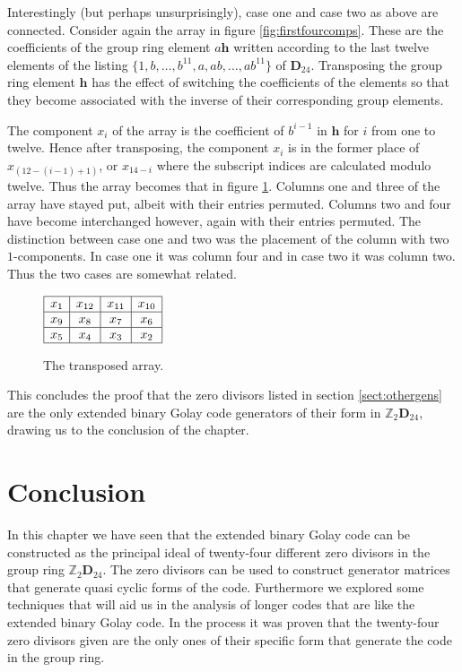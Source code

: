 Interestingly (but perhaps unsurprisingly), case one and case two as above are connected.
Consider again the array in figure \ref{fig:firstfourcomps}.
These are the coefficients of the group ring element $a \mathbf{h}$ written according to the last twelve elements of the listing $\{1,b,\ldots,b^{11},a,ab,\ldots,ab^{11}\}$ of $\mathbf{D}_{24}$.
Transposing the group ring element $\mathbf{h}$ has the effect of switching the coefficients of the elements so that they become associated with the inverse of their corresponding group elements.

The component $x_i$ of the array is the coefficient of $b^{i-1}$ in $\mathbf{h}$ for $i$ from one to twelve.
Hence after transposing, the component $x_i$ is in the former place of $x_{(12-(i-1)+1)}$, or $x_{14-i}$ where the subscript indices are calculated modulo twelve. 
Thus the array becomes that in figure \ref{fig:transposedarray}.
Columns one and three of the array have stayed put, albeit with their entries permuted.
Columns two and four have become interchanged however, again with their entries permuted.
The distinction between case one and two was the placement of the column with two $1$-components.
In case one it was column four and in case two it was column two.
Thus the two cases are somewhat related.
\begin{figure}
\begin{center}
$\begin{array}{|c|c|c|c|}
	\hline
	 x_{ 1} & x_{12} & x_{11} & x_{10} \\
	\hline
	 x_{ 9} & x_{ 8} & x_{ 7} & x_{ 6} \\
	\hline
	 x_{ 5} & x_{ 4} & x_{ 3} & x_{ 2} \\
	\hline
\end{array}$
\caption{The transposed array.}
\label{fig:transposedarray}
\end{center}
\end{figure}
This concludes the proof that the zero divisors listed in section \ref{sect:othergens} are the only extended binary Golay code generators of their form in $\mathbb{Z}_2 \mathbf{D}_{24}$, drawing us to the conclusion of the chapter.

\section*{Conclusion}
In this chapter we have seen that the extended binary Golay code can be constructed as the principal ideal of twenty-four different zero divisors in the group ring $\mathbb{Z}_2 \mathbf{D}_{24}$.
The zero divisors can be used to construct generator matrices that generate quasi cyclic forms of the code.
Furthermore we explored some techniques that will aid us in the analysis of longer codes that are like the extended binary Golay code.
In the process it was proven that the twenty-four zero divisors given are the only ones of their specific form that generate the code in the group ring.

